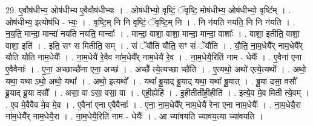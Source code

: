 \documentclass[17pt]{extarticle}
\begin{document}
29. ए॒वौष॑धीभ्य॒ ओष॑धीभ्य ए॒वैवौष॑धीभ्यः । . ओष॑धीभ्यो॒ वृष्टिं॒ ॅवृष्टि॒ मोष॑धीभ्य॒ ओष॑धीभ्यो॒ वृष्टि᳚म् । . ओष॑धीभ्य॒ इत्योष॑धि - भ्यः॒ । . वृष्टि॒म् नि नि वृष्टिं॒ ॅवृष्टि॒म् नि । . नि न॑यति नयति॒ नि नि न॑यति । . न॒य॒ति॒ मान्दा॒ मान्दा॑ नयति नयति॒ मान्दाः᳚ । . मान्दा॒ वाशा॒ वाशा॒ मान्दा॒ मान्दा॒ वाशाः᳚ । . वाशा॒ इतीति॒ वाशा॒ वाशा॒ इति॑ । . इति॒ सꣳ स मितीति॒ सम् । . सं ॅयौ॑ति यौति॒ सꣳ सं ॅयौ॑ति । . यौ॒ति॒ ना॒म॒धेयै᳚र् नाम॒धेयै᳚र् यौति यौति नाम॒धेयैः᳚ । . ना॒म॒धेयै॑ रे॒वैव ना॑म॒धेयै᳚र् नाम॒धेयै॑ रे॒व । . ना॒म॒धेयै॒रिति॑ नाम - धेयैः᳚ । . ए॒वैना॑ एना ए॒वैवैनाः᳚ । . ए॒ना॒ अच्छाच्छै॑ना एना॒ अच्छ॑ । . अच्छै᳚ त्ये॒त्यच्छा च्छै॑ति । . ए॒त्यथो॒ अथो॑ एत्ये॒त्यथो᳚ । . अथो॒ यथा॒ यथा ऽथो॒ अथो॒ यथा᳚ । . अथो॒ इत्यथो᳚ । . यथा᳚ ब्रू॒याद् ब्रू॒याद् यथा॒ यथा᳚ ब्रू॒यात् । . ब्रू॒या दसा॒ वसौ᳚ ब्रू॒याद् ब्रू॒या दसौ᳚ । . असा॒ वा ऽसा॒ वसा॒ वा । . एही॒ह्येहि॑ । . इ॒हीतीती॑ही॒हीति॑ । . इत्ये॒व मे॒व मिती त्ये॒वम् । . ए॒व मे॒वैवैव मे॒व मे॒व । . ए॒वैना॑ एना ए॒वैवैनाः᳚ । . ए॒ना॒ ना॒म॒धेयै᳚र् नाम॒धेयै॑ रेना एना नाम॒धेयैः᳚ । . ना॒म॒धेयै॒रा ना॑म॒धेयै᳚र् नाम॒धेयै॒रा । . ना॒म॒धेयै॒रिति॑ नाम - धेयैः᳚ । . आ च्या॑वयति च्यावय॒त्या च्या॑वयति । \newline
\end{document}
